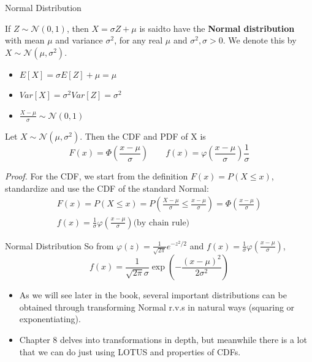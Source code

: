 \documentclass[8pt]{beamer}
\begin{document}
\begin{frame}{Normal Distribution}
    \begin{definition}
        If $Z \sim \mathcal{N}(0,1)$, then $X = \sigma Z + \mu$ is saidto have the \textbf{Normal distribution} with mean $\mu$ and variance $\sigma^2$, for any real $\mu$ and $\sigma^2, \sigma > 0$. We denote this by $X \sim \mathcal{N}(\mu, \sigma^2)$.
    \end{definition}

    \begin{itemize}
        \item \(E[X] = \sigma E[Z]+\mu = \mu\)
        \item \(Var[X] = \sigma^2 Var[Z] = \sigma^2\)
        \item $\frac{X - \mu}{\sigma} \sim \mathcal{N}(0, 1)$
    \end{itemize}

    \begin{theorem}
        Let $X \sim \mathcal{N}(\mu, \sigma^2)$. Then the CDF and PDF of X is 
        \[
        F(x) = \Phi\left(\frac{x-\mu}{\sigma}\right) \qquad f(x) = \varphi\left(\frac{x-\mu}{\sigma}\right)\frac{1}{\sigma}
        \]
    \end{theorem}
    \textit{Proof.} For the CDF, we start from the definition $F(x) = P(X\leq x)$, standardize and use the CDF of the standard Normal:
\[
\begin{gathered}
    F(x) = P(X\leq x) = P\left(\frac{X-\mu}{\sigma}\leq \frac{x-\mu}{\sigma}\right) = \Phi\left(\frac{x-\mu}{\sigma}\right)\\
    f(x) = \frac{1}{\sigma}\varphi\left(\frac{x-\mu}{\sigma}\right) \text{(by chain rule)}
\end{gathered}
\]

\end{frame}

\begin{frame}{Normal Distribution}
    So from $\varphi(z) = \frac{1}{\sqrt{2\pi}} e^{-z^2/2}$ and $f(x) = \frac{1}{\sigma} \varphi\left(\frac{x-\mu}{\sigma}\right)$,
    \[f(x) = \frac{1}{\sqrt{2\pi}\sigma} \exp{\left(- \frac{(x-\mu)^2}{2\sigma^2}\right)}\]

    \begin{itemize}
        \item As we will see later in the book, several important distributions can be obtained through transforming Normal r.v.s in natural ways (squaring or exponentiating). 
        \item Chapter 8 delves into transformations in depth, but meanwhile there is a lot that we can do just using LOTUS and properties of CDFs.
    \end{itemize}
\end{frame}
\end{document}
